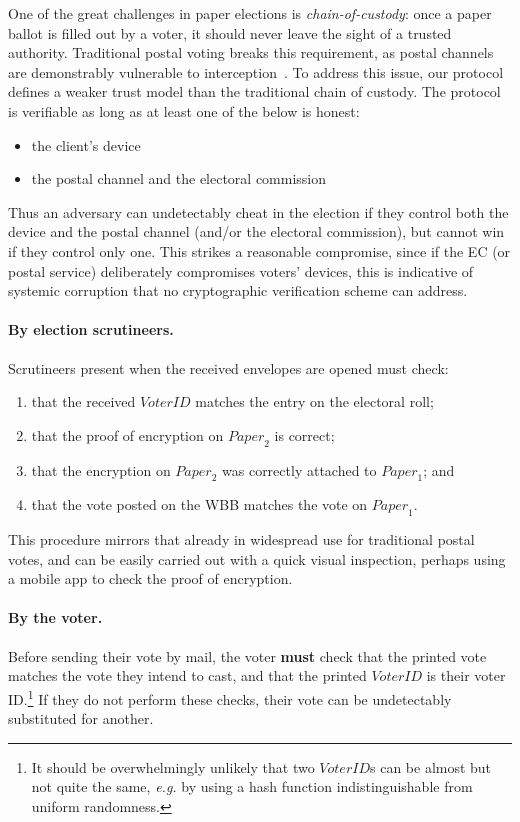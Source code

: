 \documentclass[12pt,a4paper]{article}
\theoremstyle{definition}
\newcommand{\VoterID}{\mathit{VoterID}}
\newcommand{\Paper}{\mathit{Paper}}
\newcommand{\eg}{\textit{e.g. }}
\begin{document}
One of the great challenges in paper elections is \textit{chain-of-custody}: once a paper ballot is filled out by a voter, it should never leave the sight of a trusted authority. Traditional postal voting breaks this requirement, as postal channels are demonstrably vulnerable to interception~\cite{stewart2010losing}. To address this issue, our protocol defines a weaker trust model than the traditional chain of custody. The protocol is verifiable as long as at least one of the below is honest:
\begin{itemize}
    \item the client's device
    \item the postal channel and the electoral commission
\end{itemize}
Thus an adversary can undetectably cheat in the election if they control both the device and the postal channel (and/or the electoral commission), but cannot win if they control only one. This strikes a reasonable compromise, since if the EC (or postal service) deliberately compromises voters' devices, this is indicative of systemic corruption that no cryptographic verification scheme can address.

\paragraph{By election scrutineers.} Scrutineers present when the received envelopes are opened must check:
\begin{enumerate}
    \item that the received $\VoterID$ matches the entry on the electoral roll;
    \item that the proof of encryption on $\Paper_2$ is correct;
    \item that the encryption on $\Paper_2$ was correctly attached to $\Paper_1$; and
    \item that the vote posted on the WBB matches the vote on $\Paper_1$.
\end{enumerate}
This procedure mirrors that already in widespread use for traditional postal votes, and can be easily carried out with a quick visual inspection, perhaps using a mobile app to check the proof of encryption.

\paragraph{By the voter.} Before sending their vote by mail, the voter \textbf{must} check that the printed vote matches the vote they intend to cast, and that the printed $\VoterID$ is their voter ID.\footnote{It should be overwhelmingly unlikely that two $\VoterID$s can be almost but not quite the same, \eg by using a hash function indistinguishable from uniform randomness.} If they do not perform these checks, their vote can be undetectably substituted for another.
\end{document}
